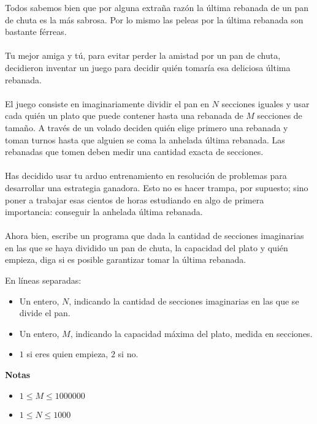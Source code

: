 
Todos sabemos bien que por alguna extraña razón la última rebanada de un pan de chuta es la más sabrosa. Por lo mismo las peleas por la última rebanada son bastante férreas.
\\ \\
Tu mejor amiga y tú, para evitar perder la amistad por un pan de chuta, decidieron inventar un juego para decidir quién tomaría esa deliciosa última rebanada.
\\ \\
El juego consiste en imaginariamente dividir el pan en $N$ secciones iguales y usar cada quién un plato que puede contener hasta una rebanada de $M$ secciones de tamaño. A través de un volado deciden quién elige primero una rebanada y toman turnos hasta que alguien se coma la anhelada última rebanada. Las rebanadas que tomen deben medir una cantidad exacta de secciones.
\\\\
Has decidido usar tu arduo entrenamiento en resolución de problemas para desarrollar una estrategia ganadora. Esto no es hacer trampa, por supuesto; sino poner a trabajar esas cientos de horas estudiando en algo de primera importancia: conseguir la anhelada última rebanada.
\\\\
Ahora bien, escribe un programa que dada la cantidad de secciones imaginarias en las que se haya dividido un pan de chuta, la capacidad del plato y quién empieza, diga si es posible garantizar tomar la última rebanada.


En líneas separadas:
\begin{itemize}
    \item Un entero, $N$, indicando la cantidad de secciones imaginarias en las que se divide el pan.
    \item Un entero, $M$, indicando la capacidad máxima del plato, medida en secciones.
    \item $1$ si eres quien empieza, $2$ si no.
\end{itemize}

\textbf{Notas}
\begin{itemize}
    \item $1 \le M \le 1000000$
    \item $1 \le N \le 1000$
\end{itemize}

